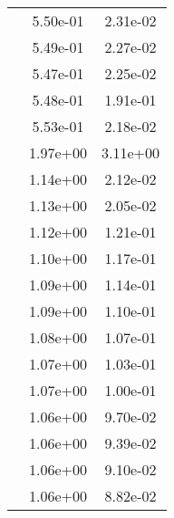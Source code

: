 \begin{table}
\begin{tabular}{c|cc|}
\multicolumn{1}{|c|}{} & \multicolumn{1}{|c|}{  5.50e-01} & \multicolumn{1}{|c|}{  2.31e-02} \\ 
\multicolumn{1}{|c|}{} & \multicolumn{1}{|c|}{  5.49e-01} & \multicolumn{1}{|c|}{  2.27e-02} \\ 
\multicolumn{1}{|c|}{} & \multicolumn{1}{|c|}{  5.47e-01} & \multicolumn{1}{|c|}{  2.25e-02} \\ 
\multicolumn{1}{|c|}{} & \multicolumn{1}{|c|}{  5.48e-01} & \multicolumn{1}{|c|}{  1.91e-01} \\ 
\multicolumn{1}{|c|}{} & \multicolumn{1}{|c|}{  5.53e-01} & \multicolumn{1}{|c|}{  2.18e-02} \\ 
\multicolumn{1}{|c|}{} & \multicolumn{1}{|c|}{  1.97e+00} & \multicolumn{1}{|c|}{  3.11e+00} \\ 
\multicolumn{1}{|c|}{} & \multicolumn{1}{|c|}{  1.14e+00} & \multicolumn{1}{|c|}{  2.12e-02} \\ 
\multicolumn{1}{|c|}{} & \multicolumn{1}{|c|}{  1.13e+00} & \multicolumn{1}{|c|}{  2.05e-02} \\ 
\multicolumn{1}{|c|}{} & \multicolumn{1}{|c|}{  1.12e+00} & \multicolumn{1}{|c|}{  1.21e-01} \\ 
\multicolumn{1}{|c|}{} & \multicolumn{1}{|c|}{  1.10e+00} & \multicolumn{1}{|c|}{  1.17e-01} \\ 
\multicolumn{1}{|c|}{} & \multicolumn{1}{|c|}{  1.09e+00} & \multicolumn{1}{|c|}{  1.14e-01} \\ 
\multicolumn{1}{|c|}{} & \multicolumn{1}{|c|}{  1.09e+00} & \multicolumn{1}{|c|}{  1.10e-01} \\ 
\multicolumn{1}{|c|}{} & \multicolumn{1}{|c|}{  1.08e+00} & \multicolumn{1}{|c|}{  1.07e-01} \\ 
\multicolumn{1}{|c|}{} & \multicolumn{1}{|c|}{  1.07e+00} & \multicolumn{1}{|c|}{  1.03e-01} \\ 
\multicolumn{1}{|c|}{} & \multicolumn{1}{|c|}{  1.07e+00} & \multicolumn{1}{|c|}{  1.00e-01} \\ 
\multicolumn{1}{|c|}{} & \multicolumn{1}{|c|}{  1.06e+00} & \multicolumn{1}{|c|}{  9.70e-02} \\ 
\multicolumn{1}{|c|}{} & \multicolumn{1}{|c|}{  1.06e+00} & \multicolumn{1}{|c|}{  9.39e-02} \\ 
\multicolumn{1}{|c|}{} & \multicolumn{1}{|c|}{  1.06e+00} & \multicolumn{1}{|c|}{  9.10e-02} \\ 
\multicolumn{1}{|c|}{} & \multicolumn{1}{|c|}{  1.06e+00} & \multicolumn{1}{|c|}{  8.82e-02} \\ 

\end{tabular}
\end{table}
